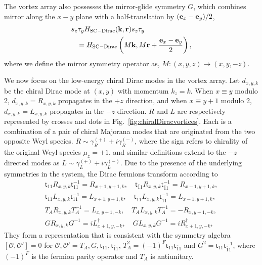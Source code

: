 The vortex array also possesses the mirror-glide symmetry $G$, which combines mirror along the $x-y$ plane with a half-translation by $({\bf e}_x-{\bf e}_y)/2$,
\begin{align}&s_z\tau_yH_{\mathrm{SC-Dirac}}({\bf k},{\bf r})s_z\tau_y\nonumber\\&\;\;\;=H_{\mathrm{SC-Dirac}}\left(M{\bf k},M{\bf r}+\frac{{\bf e}_x-{\bf e}_y}{2}\right),\label{GH}\end{align}
where we define the mirror symmetry operator as, $M:(x,y,z)\to(x,y,-z)$.



We now focus on the low-energy chiral Dirac modes in the vortex array. Let $d_{x,y,k}$ be the chiral Dirac mode at $(x,y)$ with momentum $k_z=k$. When $x\equiv y$ modulo 2, $d_{x,y,k}=R_{x,y,k}$ propagates in the $+z$ direction, and when $x\equiv y+1$ modulo 2, $d_{x,y,k}=L_{x,y,k}$ propagates in the $-z$ direction. $R$ and $L$ are respectively represented by crosses and dots in Fig.~\ref{fig:chiralDiracvortices}. Each is a combination of a pair of chiral Majorana modes that are originated from the two opposite Weyl species. $R\sim\gamma_R^{(+)}+i\gamma_R^{(-)}$, where the sign refers to chirality of the original Weyl species $\mu_z=\pm1$, and similar definitions extend to the $-z$ directed modes as $L\sim\gamma_L^{(+)}+i\gamma_L^{(-)}$. Due to the presence of the underlying symmetries in the system, the Dirac fermions transform according to \begin{gather}\mathsf{t}_{11}R_{x,y,k}\mathsf{t}_{11}^{-1}=R_{x+1,y+1,k},\quad\mathsf{t}_{\bar{1}1}R_{x,y,k}\mathsf{t}_{\bar{1}1}^{-1}=R_{x-1,y+1,k},\nonumber\\\mathsf{t}_{11}L_{x,y,k}\mathsf{t}_{11}^{-1}=L_{x+1,y+1,k},\quad\mathsf{t}_{\bar{1}1}L_{x,y,k}\mathsf{t}_{\bar{1}1}^{-1}=L_{x-1,y+1,k},\nonumber\\T_AR_{x,y,k}T_A^{-1}=L_{x,y+1,-k},\quad T_AL_{x,y,k}T_A^{-1}=-R_{x,y+1,-k},\nonumber\\GR_{x,y,k}G^{-1}=iL_{x+1,y,-k}^\dagger,\quad GL_{x,y,k}G^{-1}=iR_{x+1,y,-k}^\dagger,\label{CWsymmetries}\end{gather} They form a representation that is consistent with the symmetry algebra $[\mathcal{O},\mathcal{O}']=0$ for $\mathcal{O},\mathcal{O}'=T_A,G,\mathsf{t}_{11},\mathsf{t}_{\bar{1}1}$, $T_A^2=(-1)^F\mathsf{t}_{11}\mathsf{t}_{\bar{1}1}$ and $G^2=\mathsf{t}_{11}\mathsf{t}_{\bar{1}1}^{-1}$, where $(-1)^F$ is the fermion parity operator and $T_A$ is antiunitary.

